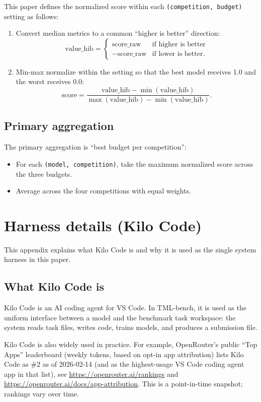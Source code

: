 This paper defines the normalized score within each \texttt{(competition, budget)} setting as follows:
\begin{enumerate}
  \item Convert median metrics to a common ``higher is better'' direction:
    \[
      \mathrm{value\_hib} =
      \begin{cases}
        \mathrm{score\_raw} & \text{if higher is better} \\
        -\mathrm{score\_raw} & \text{if lower is better.}
      \end{cases}
    \]
  \item Min-max normalize within the setting so that the best model receives 1.0 and the worst receives 0.0:
    \[
      \mathrm{score} = \frac{\mathrm{value\_hib} - \min(\mathrm{value\_hib})}{\max(\mathrm{value\_hib}) - \min(\mathrm{value\_hib})}.
    \]
\end{enumerate}

\subsection{Primary aggregation}
The primary aggregation is ``best budget per competition'':
\begin{itemize}
  \item For each \texttt{(model, competition)}, take the maximum normalized score across the three budgets.
  \item Average across the four competitions with equal weights.
\end{itemize}

\clearpage
\section{Harness details (Kilo Code)}
\label{sec:appendix-harness}

This appendix explains what Kilo Code is and why it is used as the single system harness in this paper.

\subsection{What Kilo Code is}
Kilo Code is an AI coding agent for VS Code. In TML-bench, it is used as the uniform interface between a model and the benchmark task workspace: the system reads task files, writes code, trains models, and produces a submission file.

Kilo Code is also widely used in practice. For example, OpenRouter's public ``Top Apps'' leaderboard (weekly tokens, based on opt-in app attribution) lists Kilo Code as \#2 as of 2026-02-14 (and as the highest-usage VS Code coding agent app in that list), see \url{https://openrouter.ai/rankings} and \url{https://openrouter.ai/docs/app-attribution}. This is a point-in-time snapshot; rankings vary over time.

